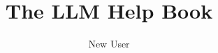 \documentclass[12pt,a4paper,openany]{book}
\begin{document}
\frontmatter

\title{The LLM Help Book}
\author{New User}
\maketitle

\tableofcontents
\listoffigures
\listoftables

\mainmatter

\clearpage


\clearpage


\clearpage

\backmatter
\printbibliography
\end{document}
